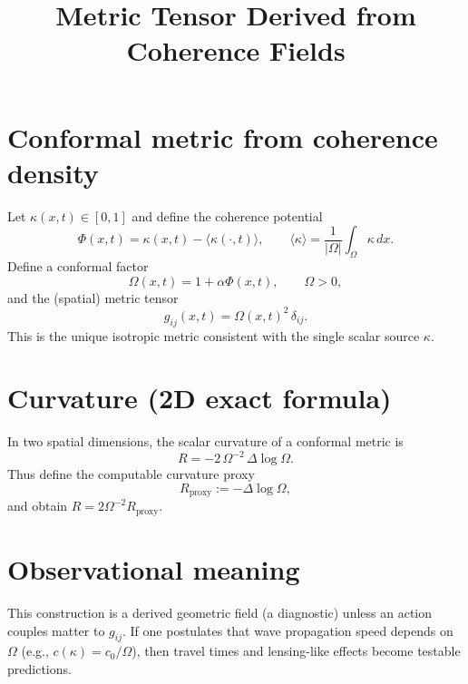 \documentclass[11pt]{article}
\title{Metric Tensor Derived from Coherence Fields}
\date{}
\begin{document}
\maketitle

\section{Conformal metric from coherence density}
Let $\kappa(x,t)\in[0,1]$ and define the coherence potential
\[
\Phi(x,t) = \kappa(x,t) - \langle \kappa(\cdot,t)\rangle,
\qquad
\langle \kappa\rangle = \frac{1}{|\Omega|}\int_\Omega \kappa\,dx.
\]
Define a conformal factor
\[
\Omega(x,t) = 1 + \alpha \Phi(x,t),
\qquad \Omega>0,
\]
and the (spatial) metric tensor
\[
g_{ij}(x,t) = \Omega(x,t)^2\,\delta_{ij}.
\]
This is the unique isotropic metric consistent with the single scalar source $\kappa$.

\section{Curvature (2D exact formula)}
In two spatial dimensions, the scalar curvature of a conformal metric is
\[
R = -2\,\Omega^{-2}\,\Delta \log \Omega.
\]
Thus define the computable curvature proxy
\[
R_{\mathrm{proxy}} := -\Delta \log \Omega,
\]
and obtain $R = 2\Omega^{-2} R_{\mathrm{proxy}}$.

\section{Observational meaning}
This construction is a derived geometric field (a diagnostic) unless an action couples matter to $g_{ij}$.
If one postulates that wave propagation speed depends on $\Omega$ (e.g., $c(\kappa)=c_0/\Omega$),
then travel times and lensing-like effects become testable predictions.
\end{document}
